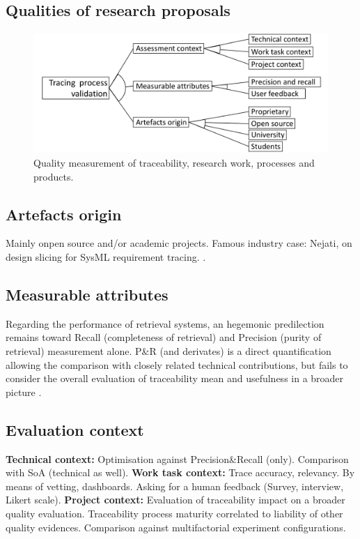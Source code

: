 

\subsection{Qualities of research proposals}
\begin{figure}[h]
	\centering
	\includegraphics[width=.65\linewidth]{images/fm-quality}
	\caption{Quality measurement of traceability, research work, processes and products.}
	\label{fig:fm:quality}
\end{figure}


\subsection{Artefacts origin}
Mainly onpen source and/or academic projects.
Famous industry case: Nejati, on design slicing for SysML requirement tracing. .


\subsection{Measurable attributes} 
Regarding the performance of retrieval systems, an hegemonic predilection remains toward Recall (completeness of retrieval) and Precision (purity of retrieval) measurement alone. P\&R (and derivates) is a direct quantification allowing the comparison with closely related technical contributions, but fails to consider the overall evaluation of traceability mean and usefulness in a broader picture .

\subsection{Evaluation context} \textbf{Technical context:} Optimisation against Precision\&Recall (only). Comparison with SoA (technical as well).
\textbf{Work task context:} Trace accuracy, relevancy. By means of vetting, dashboards. Asking for a human feedback (Survey, interview, Likert scale).
\textbf{Project context:} Evaluation of traceability impact on a broader quality evaluation. Traceability process maturity correlated to liability of other quality evidences. Comparison against multifactorial experiment configurations.

